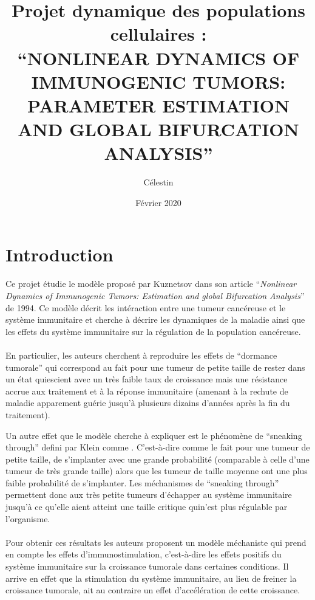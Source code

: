 \documentclass[12pt]{article}
\title{Projet dynamique des populations cellulaires :\\
``NONLINEAR DYNAMICS OF IMMUNOGENIC TUMORS: PARAMETER ESTIMATION AND GLOBAL BIFURCATION ANALYSIS''}
\author{Célestin \bsc{Bigarré}}
\date{Février 2020}
\begin{document}
\maketitle
\section*{Introduction}
Ce projet étudie le modèle proposé par Kuznetsov dans son article ``\emph{Nonlinear  Dynamics of Immunogenic Tumors: Estimation and global Bifurcation Analysis}'' de 1994. Ce modèle décrit les intéraction entre une tumeur cancéreuse et le système immunitaire et cherche à décrire les dynamiques de la maladie ainsi que les effets du système immunitaire sur la régulation de la population cancéreuse. 

\paragraph{} En particulier, les auteurs cherchent à reproduire les effets de ``dormance tumorale'' qui correspond au fait pour une tumeur de petite taille de rester dans un état quiescient avec un très faible taux de croissance mais une résistance accrue aux traitement et à la réponse immunitaire (amenant à la rechute de maladie apparement guérie jusqu'à plusieurs dizains d'années après la fin du traitement).

Un autre effet que le modèle cherche à expliquer est le phénomène de ``sneaking through'' defini par Klein \cite{klein_1966} comme . C'est-à-dire comme le fait pour une tumeur de petite taille, de s'implanter avec une grande probabilité (comparable à celle d'une tumeur de très grande taille) alors que les tumeur de taille moyenne ont une plus faible probabilité de s'implanter. Les méchanismes de ``sneaking through'' permettent donc aux très petite tumeurs d'échapper au système immunitaire jusqu'à ce qu'elle aient atteint une taille critique quin'est plus régulable par l'organisme. 

\paragraph{}Pour obtenir ces résultats les auteurs proposent un modèle méchaniste qui prend en compte les effets d'immunostimulation, c'est-à-dire les effets positifs du système immunitaire sur la croissance tumorale dans certaines conditions. Il arrive en effet que la stimulation du système immunitaire, au lieu de freiner la croissance tumorale, ait au contraire un effet d'accélération de cette croissance. 
\end{document}
